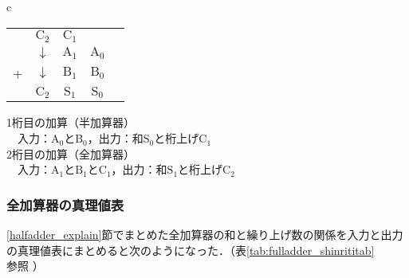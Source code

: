 \begin {table}[ht]
\begin {center}
	\begin{tabular}{c}
		\begin{minipage}{7cm}
		\begin{center}
			\begin {tabular}{ccccc}
				&$\mathrm{C_2}$&$\mathrm{C_1}$&\\
				&$\downarrow $&$\mathrm{A_1}$&$\mathrm{A_0}$\\
				+&$\downarrow $&$\mathrm{B_1}$&$\mathrm{B_0}$\\ \hline
				&$\mathrm{C_2}$&$\mathrm{S_1}$&$\mathrm{S_0}$
			\end{tabular}
		\end{center}
		\end{minipage}
		
		\begin{minipage}{8cm}
		\begin{flushleft}
			1桁目の加算（半加算器）\\
			　入力：$\mathrm{A_0} $と$\mathrm{B_0} $，出力：和$\mathrm{S_0} $と桁上げ$\mathrm{C_1} $\\
			2桁目の加算（全加算器）\\
			　入力：$\mathrm{A_1} $と$\mathrm{B_1} $と$\mathrm{C_1} $，出力：和$\mathrm{S_1} $と桁上げ$\mathrm{C_2} $\\
		\end{flushleft}
		\end{minipage}
		
	\end{tabular}
\end{center}
\end{table}

%
%
\subsubsection{全加算器の真理値表}
\label{fulladder_shinriti}
\ref{halfadder_explain}節でまとめた全加算器の和と繰り上げ数の関係を入力と出力の真理値表にまとめると次のようになった．（表\ref{tab:fulladder_shinrititab}参照 ）

